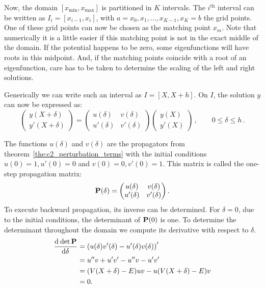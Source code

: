Now, the domain $[x_\text{min}, x_\text{max}]$ is partitioned in $K$ intervals. The $i^\text{th}$ interval can be written as $I_i = [x_{i-1}, x_{i}]$, with $a = x_0, x_1, \dots, x_{K-1}, x_{K} = b$ the grid points. One of these grid points can now be chosen as the matching point $x_m$. Note that numerically it is a little easier if this matching point is not in the exact middle of the domain. If the potential happens to be zero, some eigenfunctions will have roots in this midpoint. And, if the matching points coincide with a root of an eigenfunction, care has to be taken to determine the scaling of the left and right solutions.

Generically we can write such an interval as $I = [X, X+h]$. On $I$, the solution $y$ can now be expressed as:
\begin{equation}
    \begin{pmatrix}y(X+\delta) \\ y'(X+\delta)\end{pmatrix}
    = \begin{pmatrix} u(\delta) & v(\delta) \\ u'(\delta) & v'(\delta) \end{pmatrix} \begin{pmatrix} y(X) \\ y'(X) \end{pmatrix} \,, \qquad %
    0 \leq \delta \leq h \,. \label{equ:c2_cpm_propmatrix}
\end{equation}

The functions $u(\delta)$ and $v(\delta)$ are the propagators from theorem~\ref{the:c2_perturbation_terms} with the initial conditions $u(0) = 1, u'(0)=0$ and
$v(0) = 0, v'(0)=1$. This matrix is called the one-step propagation matrix:
\begin{equation}\label{equ:c2_propagation_matrix}
    \vb{P}(\delta) = \begin{pmatrix} u(\delta) & v(\delta) \\ u'(\delta) & v'(\delta) \end{pmatrix}\text{.}
\end{equation}
To execute backward propagation, its inverse can be determined. For $\delta = 0$, due to the initial conditions, the determinant of $\vb{P}(0)$ is one. To determine the determinant throughout the domain we compute its derivative with respect to $\delta$.
\begin{align*}
    \dv[]{\det\vb{P}}{\delta} & = \left(u(\delta) v'(\delta) - u'(\delta) v(\delta)\right)' \\
                              & = u'' v + u'v' - u''v - u'v'                                \\
                              & =(V(X+\delta) - E) u v - u (V(X+\delta) - E) v              \\
                              & =0\text{.}
\end{align*}

